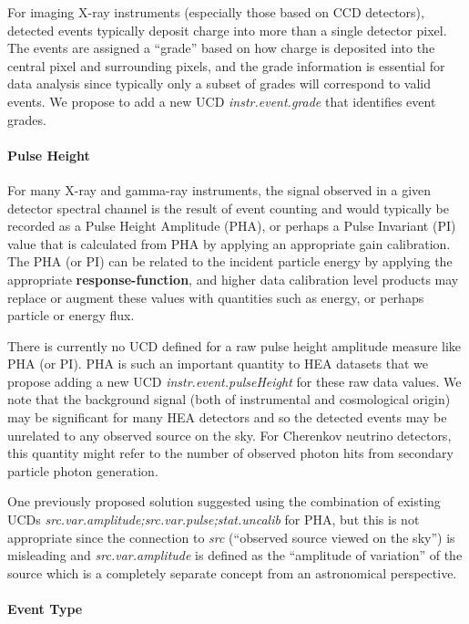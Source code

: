 \documentclass[11pt,a4paper]{ivoa}
\begin{document}
For imaging X-ray instruments (especially those based on CCD detectors), detected events typically deposit charge into more than a single detector pixel.  The events are assigned a ``grade'' based on how charge is deposited into the central pixel and surrounding pixels, and the grade information is essential for data analysis since typically only a subset of grades will correspond to valid events.  We propose to add a new UCD {\em instr.event.grade\/} that identifies event grades.

\paragraph{Pulse Height}

For many X-ray and gamma-ray instruments, the signal observed in a given detector spectral channel is the result of event counting and would typically be recorded as a Pulse Height Amplitude (PHA), or perhaps a Pulse Invariant (PI) value that is calculated from PHA by applying an appropriate gain calibration.  The PHA (or PI) can be related to the incident particle energy by applying the appropriate {\bf response-function}, and higher data calibration level products may replace or augment these values with quantities such as energy, or perhaps particle or energy flux.

There is currently no UCD defined for a raw pulse height amplitude measure like PHA (or PI). PHA is such an important quantity to \gls{HEA} datasets that we propose adding a new UCD {\em instr.event.pulseHeight\/} for these raw data values.  We note that the background signal (both of instrumental and cosmological origin) may be significant for many \gls{HEA} detectors and so the detected events may be unrelated to any observed source on the sky. For Cherenkov neutrino detectors, this quantity might refer to the number of observed photon hits from secondary particle photon generation.

One previously proposed solution suggested using the combination of existing UCDs {\em src.var.amplitude;src.var.pulse;stat.uncalib\/} for PHA, but this is not appropriate since the connection to {\em src\/} (``observed source viewed on the sky'') is misleading and {\em src.var.amplitude\/} is defined as the ``amplitude of variation'' of the source which is a completely separate concept from an astronomical perspective.

\paragraph{Event Type}
\end{document}

